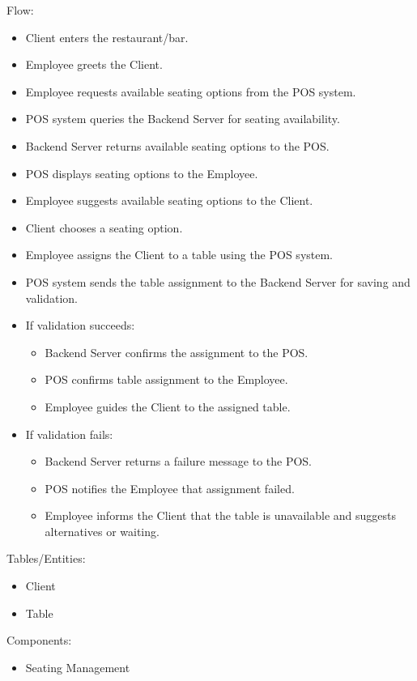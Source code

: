 \documentclass[]{VUMIFTemplateClass}
\begin{document}
Flow:
\begin{itemize}
\setlength{\itemsep}{2pt}
\setlength{\parskip}{0pt}
\setlength{\parsep}{0pt}
\item Client enters the restaurant/bar.
\item Employee greets the Client.
\item Employee requests available seating options from the POS system.
\item POS system queries the Backend Server for seating availability.
\item Backend Server returns available seating options to the POS.
\item POS displays seating options to the Employee.
\item Employee suggests available seating options to the Client.
\item Client chooses a seating option.
\item Employee assigns the Client to a table using the POS system.
\item POS system sends the table assignment to the Backend Server for saving and validation.
\item If validation succeeds:
\begin{itemize}
\item Backend Server confirms the assignment to the POS.
\item POS confirms table assignment to the Employee.
\item Employee guides the Client to the assigned table.
\end{itemize}
\item If validation fails:
\begin{itemize}
\item Backend Server returns a failure message to the POS.
\item POS notifies the Employee that assignment failed.
\item Employee informs the Client that the table is unavailable and suggests alternatives or waiting.
\end{itemize}
\end{itemize}

Tables/Entities:
\begin{itemize}
\setlength{\itemsep}{2pt}
\setlength{\parskip}{0pt}
\setlength{\parsep}{0pt}
\item Client
\item Table
\end{itemize}

Components:
\begin{itemize}
\setlength{\itemsep}{2pt}
\setlength{\parskip}{0pt}
\setlength{\parsep}{0pt}
\item Seating Management
\end{itemize}
\end{document}
